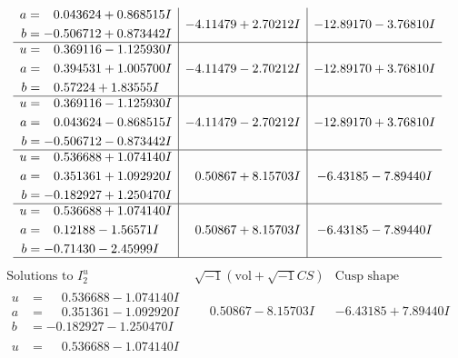\documentclass[1p]{elsarticle_modified}
\theoremstyle{definition}
\newcommand{\I}{\sqrt{-1}}
\begin{document}
$$\begin{array}{c|c|c}
\begin{aligned}
a &= \phantom{-}0.043624 + 0.868515 I \\
b &= -0.506712 + 0.873442 I\end{aligned}
 & -4.11479 + 2.70212 I & -12.89170 - 3.76810 I \\ \hline\begin{aligned}
u &= \phantom{-}0.369116 - 1.125930 I \\
a &= \phantom{-}0.394531 + 1.005700 I \\
b &= \phantom{-}0.57224 + 1.83555 I\end{aligned}
 & -4.11479 - 2.70212 I & -12.89170 + 3.76810 I \\ \hline\begin{aligned}
u &= \phantom{-}0.369116 - 1.125930 I \\
a &= \phantom{-}0.043624 - 0.868515 I \\
b &= -0.506712 - 0.873442 I\end{aligned}
 & -4.11479 - 2.70212 I & -12.89170 + 3.76810 I \\ \hline\begin{aligned}
u &= \phantom{-}0.536688 + 1.074140 I \\
a &= \phantom{-}0.351361 + 1.092920 I \\
b &= -0.182927 + 1.250470 I\end{aligned}
 & \phantom{-}0.50867 + 8.15703 I & -6.43185 - 7.89440 I \\ \hline\begin{aligned}
u &= \phantom{-}0.536688 + 1.074140 I \\
a &= \phantom{-}0.12188 - 1.56571 I \\
b &= -0.71430 - 2.45999 I\end{aligned}
 & \phantom{-}0.50867 + 8.15703 I & -6.43185 - 7.89440 I\\
 \hline 
 \end{array}$$\newpage$$\begin{array}{c|c|c}  
\text{Solutions to }I^u_{2}& \I (\text{vol} + \sqrt{-1}CS) & \text{Cusp shape}\\
 \hline 
\begin{aligned}
u &= \phantom{-}0.536688 - 1.074140 I \\
a &= \phantom{-}0.351361 - 1.092920 I \\
b &= -0.182927 - 1.250470 I\end{aligned}
 & \phantom{-}0.50867 - 8.15703 I & -6.43185 + 7.89440 I \\ \hline\begin{aligned}
u &= \phantom{-}0.536688 - 1.074140 I \\

\end{aligned}
\end{array}$$
\end{document}
